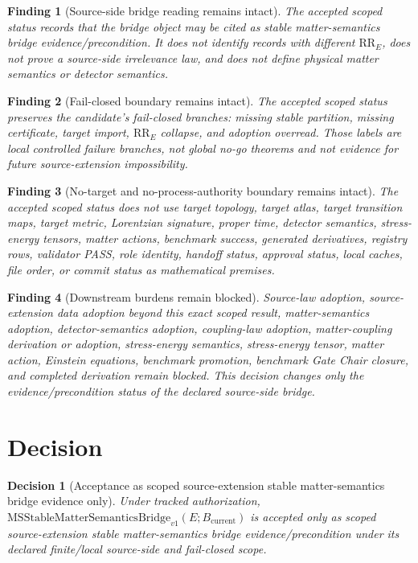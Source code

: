 \documentclass[11pt]{article}
\newcommand{\Bcur}{B_{\mathrm{current}}}
\newcommand{\MSBridge}{\mathrm{MSStableMatterSemanticsBridge}_{v1}}
\newtheorem{decision}{Decision}
\newtheorem{finding}{Finding}
\begin{document}
\begin{finding}[Source-side bridge reading remains intact]
The accepted scoped status records that the bridge object may be cited as
stable matter-semantics bridge evidence/precondition. It does not identify
records with different \(\mathrm{RR}_E\), does not prove a source-side
irrelevance law, and does not define physical matter semantics or detector
semantics.
\end{finding}

\begin{finding}[Fail-closed boundary remains intact]
The accepted scoped status preserves the candidate's fail-closed branches:
missing stable partition, missing certificate, target import,
\(\mathrm{RR}_E\) collapse, and adoption overread. Those labels are local
controlled failure branches, not global no-go theorems and not evidence for
future source-extension impossibility.
\end{finding}

\begin{finding}[No-target and no-process-authority boundary remains intact]
The accepted scoped status does not use target topology, target atlas, target
transition maps, target metric, Lorentzian signature, proper time, detector
semantics, stress-energy tensors, matter actions, benchmark success,
generated derivatives, registry rows, validator PASS, role identity, handoff
status, approval status, local caches, file order, or commit status as
mathematical premises.
\end{finding}

\begin{finding}[Downstream burdens remain blocked]
Source-law adoption, source-extension data adoption beyond this exact scoped
result, matter-semantics adoption, detector-semantics adoption, coupling-law
adoption, matter-coupling derivation or adoption, stress-energy semantics,
stress-energy tensor, matter action, Einstein equations, benchmark promotion,
benchmark Gate Chair closure, and completed derivation remain blocked. This
decision changes only the evidence/precondition status of the declared
source-side bridge.
\end{finding}

\section{Decision}

\begin{decision}[Acceptance as scoped source-extension stable matter-semantics bridge evidence only]
Under tracked authorization, \(\MSBridge(E;\Bcur)\) is accepted only as
scoped source-extension stable matter-semantics bridge evidence/precondition
under its declared finite/local source-side and fail-closed scope.
\end{decision}
\end{document}
